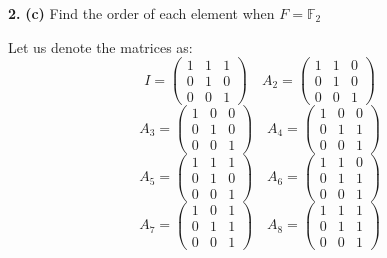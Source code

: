 \documentclass[notitlepage]{report}
\begin{document}
\textbf{2.}
\textbf{(c)} Find the order of each element when $ F = \mathbb{F}_2 $
\begin{mdframed}[]
	Let us denote the matrices as:
	\[ 	I = \begin{pmatrix}
	1&1&1  \\ 
	0&1&0 \\    
	0&0&1
	\end{pmatrix} \quad A_2 = 
	\begin{pmatrix}
	1&1&0  \\ 
	0&1&0 \\    
	0&0&1
	\end{pmatrix} \]
	\[ A_3 = 
	\begin{pmatrix}
	1&0&0  \\ 
	0&1&0 \\    
	0&0&1
	\end{pmatrix} \quad A_4 =
	\begin{pmatrix}
	1&0&0  \\ 
	0&1&1 \\    
	0&0&1
	\end{pmatrix} \]
	\[ A_5 = 
	\begin{pmatrix}
	1&1&1  \\ 
	0&1&0 \\    
	0&0&1
	\end{pmatrix} \quad A_6 =
	\begin{pmatrix}
	1&1&0  \\ 
	0&1&1 \\    
	0&0&1
	\end{pmatrix}\]
	\[ A_7 = 
	\begin{pmatrix}
	1&0&1  \\ 
	0&1&1 \\    
	0&0&1
	\end{pmatrix} \quad A_8 = 
	\begin{pmatrix}
	1&1&1  \\ 
	0&1&1 \\    
	0&0&1
	\end{pmatrix} \]
	

\end{mdframed}
\end{document}
